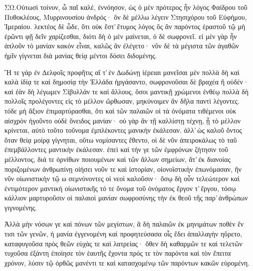 \documentclass[paper=a6]{scrartcl}
\begin{document}
\greekfont      ΣΩ.\quad Οὑτωσὶ τοίνυν, ὦ παῖ καλέ, ἐννόησον, ὡς ὁ μὲν πρότερος ἦν λόγος Φαίδρου τοῦ Πυθοκλέους, Μυρρινουσίου ἀνδρός· ὃν δὲ μέλλω λέγειν Στησιχόρου τοῦ Εὐφήμου, Ἱμεραίου. λεκτέος δὲ ὧδε, ὅτι οὐκ ἔστ’\,ἔτυμος λόγος ὃς ἂν παρόντος ἐραστοῦ τῷ μὴ ἐρῶντι φῇ δεῖν χαρίζεσθαι, διότι δὴ ὁ μὲν μαίνεται, ὁ δὲ σωφρονεῖ. εἰ μὲν γὰρ ἦν ἁπλοῦν τὸ μανίαν κακὸν εἶναι, καλῶς ἂν ἐλέγετο· νῦν δὲ τὰ μέγιστα τῶν ἀγαθῶν ἡμῖν γίγνεται διὰ μανίας θείᾳ μέντοι δόσει διδομένης.

      Ἥ τε γὰρ ἐν ∆ελφοῖς προφῆτις αἵ τ’\,ἐν ∆ωδώνῃ ἱέρειαι μανεῖσαι μὲν πολλὰ δὴ καὶ καλὰ ἰδίᾳ τε καὶ δημοσίᾳ τὴν Ἑλλάδα ἠργάσαντο, σωφρονοῦσαι δὲ βραχέα ἢ οὐδέν· καὶ ἐὰν δὴ λέγωμεν Σίβυλλάν τε καὶ ἄλλους, ὅσοι μαντικῇ χρώμενοι ἐνθέῳ πολλὰ δὴ πολλοῖς προλέγοντες εἰς τὸ μέλλον ὤρθωσαν, μηκύνοιμεν ἂν δῆλα παντὶ λέγοντες. τόδε μὴ ἄξιον ἐπιμαρτύρασθαι, ὅτι καὶ τῶν παλαιῶν οἱ τὰ ὀνόματα τιθέμενοι οὐκ αἰσχρὸν ἡγοῦντο οὐδὲ ὄνειδος μανίαν· οὐ γὰρ ἂν τῇ καλλίστῃ τέχνῃ, ᾗ τὸ μέλλον κρίνεται, αὐτὸ τοῦτο τοὔνομα ἐμπλέκοντες μανικὴν ἐκάλεσαν. ἀλλ’\,ὡς καλοῦ ὄντος ὅταν θείᾳ μοίρᾳ γίγνηται, οὕτω νομίσαντες ἔθεντο, οἱ δὲ νῦν ἀπειροκάλως τὸ ταῦ ἐπεμβάλλοντες μαντικὴν ἐκάλεσαν. ἐπεὶ καὶ τήν γε τῶν ἐμφρόνων ζήτησιν τοῦ μέλλοντος, διά τε ὀρνίθων ποιουμένων καὶ τῶν ἄλλων σημείων, ἅτ’\,ἐκ διανοίας ποριζομένων ἀνθρωπίνῃ οἰήσει νοῦν τε καὶ ἱστορίαν, οἰονοϊστικὴν ἐπωνόμασαν, ἣν νῦν οἰωνιστικὴν τῷ ω σεμνύνοντες οἱ νεοὶ καλοῦσιν· ὅσῳ δὴ οὖν τελεώτερον καὶ ἐντιμότερον μαντικὴ οἰωνιστικῆς τό τε ὄνομα τοῦ ὀνόματος ἔργον τ’\,ἔργου, τόσῳ κάλλιον μαρτυροῦσιν οἱ παλαιοὶ μανίαν σωφροσύνης τὴν ἐκ θεοῦ τῆς παρ’\,ἀνθρώπων γιγνομένης.

      Ἀλλὰ μὴν νόσων γε καὶ πόνων τῶν μεγίστων, ἃ δὴ παλαιῶν ἐκ μηνιμάτων ποθὲν ἔν τισι τῶν γενῶν, ἡ μανία ἐγγενομένη καὶ προφητεύσασα οἷς ἔδει ἀπαλλαγὴν ηὕρετο, καταφυγοῦσα πρὸς θεῶν εὐχάς τε καὶ λατρείας· ὅθεν δὴ καθαρμῶν τε καὶ τελετῶν τυχοῦσα ἐξάντη ἐποίησε τὸν ἑαυτῆς ἔχοντα πρός τε τὸν παρόντα καὶ τὸν ἔπειτα χρόνον, λύσιν τῷ ὀρθῶς μανέντι τε καὶ κατασχομένῳ τῶν παρόντων κακῶν εὑρομένη.
\end{document}
